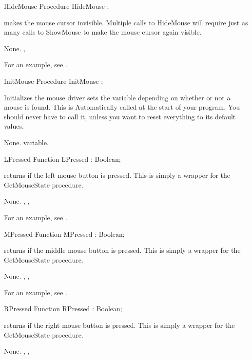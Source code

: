 \latex{}
\html{}
\begin{procedure}{HideMouse}
\Declaration
Procedure HideMouse ;

\Description

 makes the mouse cursor invisible.
Multiple calls to HideMouse will require just as many calls to ShowMouse to
make the mouse cursor again visible.

\Errors
None.
\SeeAlso
{}, 
\end{procedure}
For an example, see .
\begin{procedure}{InitMouse}
\Declaration
Procedure InitMouse ;

\Description

Initializes the mouse driver sets the variable  depending on
whether or not a mouse is found.
This is Automatically called at the start of your program. 
You should never have to call it, unless you want to reset everything to 
its default values.

\Errors
None.
\SeeAlso
{} variable.
\end{procedure}
\latex{}
\html{}
\begin{function}{LPressed}
\Declaration
Function LPressed  : Boolean;

\Description

 returns  if the left mouse button is pressed.
This is simply a wrapper for the GetMouseState procedure.

\Errors
None.
\SeeAlso
{}, , 
\end{function}
For an example, see .
\begin{function}{MPressed}
\Declaration
Function MPressed  : Boolean;

\Description

 returns  if the middle mouse button is pressed.
This is simply a wrapper for the GetMouseState procedure.

\Errors
None.
\SeeAlso
{}, , 
\end{function}
For an example, see .
\begin{function}{RPressed}
\Declaration
Function RPressed  : Boolean;

\Description

 returns  if the right mouse button is pressed.
This is simply a wrapper for the GetMouseState procedure.

\Errors
None.
\SeeAlso
{}, , 
\end{function}
